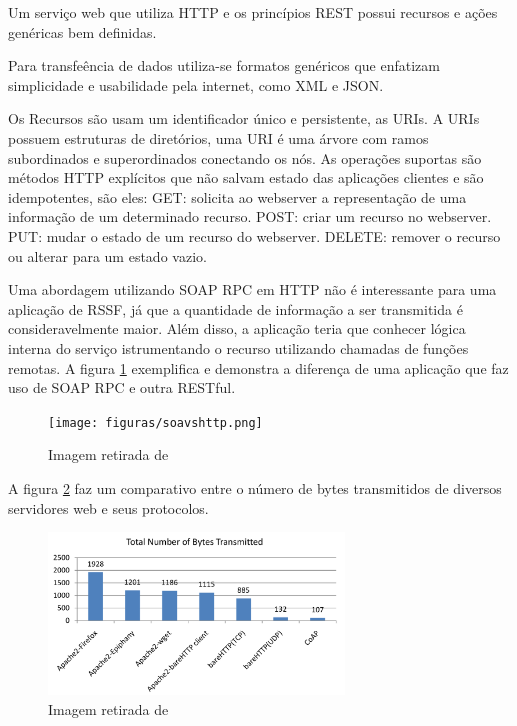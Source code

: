 Um servi\c{c}o web que utiliza HTTP e os princ\'ipios REST possui recursos e a\c{c}\~oes gen\'ericas bem definidas.\cite{rest}

Para transfe\^encia de dados utiliza-se formatos gen\'ericos que enfatizam simplicidade e usabilidade pela internet, como XML e JSON.

Os Recursos s\~ao usam um identificador \'unico e persistente, as URIs. A URIs possuem estruturas de diret\'orios, uma URI \'e uma \'arvore com ramos subordinados e superordinados conectando os n\'os. As opera\c{c}\~oes suportas s\~ao m\'etodos HTTP expl\'icitos que n\~ao salvam estado das aplica\c{c}\~oes clientes e s\~ao idempotentes, s\~ao eles:
GET: solicita ao webserver a representa\c{c}\~ao de uma informa\c{c}\~ao de um determinado recurso.
POST: criar um recurso no webserver.
PUT: mudar o estado de um recurso do webserver.
DELETE: remover o recurso ou alterar para um estado vazio.

Uma abordagem utilizando SOAP RPC em HTTP n\~ao \'e interessante para uma aplica\c{c}\~ao de RSSF, j\'a que a quantidade de informa\c{c}\~ao a ser transmitida \'e consideravelmente maior. Al\'em disso, a aplica\c{c}\~ao teria que conhecer l\'ogica interna do servi\c{c}o istrumentando o recurso utilizando chamadas de fun\c{c}\~oes remotas. A figura \ref{soaVsHttp} exemplifica e demonstra a diferen\c{c}a de uma aplica\c{c}\~ao que faz uso de SOAP RPC e outra RESTful.\cite{richardson2008restful}

\begin{figure}[h]
    \label{soaVsHttp}
    \centering
    \texttt{[image: figuras/soavshttp.png]}
    \caption{Imagem retirada de \cite{richardson2008restful}}
\end{figure}

A figura \ref{bytesTransmitted} faz um comparativo entre o n\'umero de bytes transmitidos de diversos servidores web e seus protocolos.

\begin{figure}[h]
    \label{bytesTransmitted}
    \centering
    \includegraphics[width=0.7\textwidth]{figuras/bytestransmitted.png}
    \caption{Imagem retirada de \cite{transportApp}}
\end{figure}

